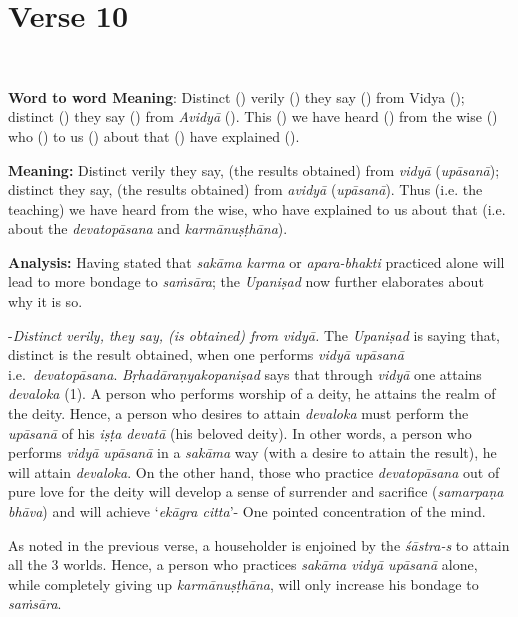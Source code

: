 \chapter{Verse 10}

\begin{moolashloka}
\\
\end{moolashloka}

\textbf{Word to word Meaning}: Distinct () verily () they say () from Vidya (); distinct () they say () from \emph{Avidyā} (). This () we have heard () from the wise () who () to us () about that () have explained ().

\textbf{Meaning:} Distinct verily they say, (the results obtained) from \emph{vidyā} (\emph{upāsanā}); distinct they say, (the results obtained) from \emph{avidyā} (\emph{upāsanā}). Thus (i.e. the teaching) we have heard from the wise, who have explained to us about that (i.e. about the \emph{devatopāsana} and \emph{karmānuṣṭhāna}).

\textbf{Analysis:} Having stated that \emph{sakāma karma} or \emph{apara-bhakti} practiced alone will lead to more bondage to \emph{saṁsāra}; the \emph{Upaniṣad} now further elaborates about why it is so.

-\emph{Distinct verily, they say, (is obtained) from vidyā.} The \emph{Upaniṣad} is saying that, distinct is the result obtained, when one performs \emph{vidyā upāsanā} i.e.\ \emph{devatopāsana}. \emph{Bṛhadāraṇyakopaniṣad} says that through \emph{vidyā} one attains \emph{devaloka} (1). A person who performs worship of a deity, he attains the realm of the deity. Hence, a person who desires to attain \emph{devaloka} must perform the \emph{upāsanā} of his \emph{iṣṭa devatā} (his beloved deity). In other words, a person who performs \emph{vidyā upāsanā} in a \emph{sakāma} way (with a desire to attain the result), he will attain \emph{devaloka}. On the other hand, those who practice \emph{devatopāsana} out of pure love for the deity will develop a sense of surrender and sacrifice (\emph{samarpaṇa bhāva}) and will achieve `\emph{ekāgra citta}'- One pointed concentration of the mind.

As noted in the previous verse, a householder is enjoined by the \emph{śāstra-s} to attain all the 3 worlds. Hence, a person who practices \emph{sakāma vidyā upāsanā} alone, while completely giving up \emph{karmānuṣṭhāna}, will only increase his bondage to \emph{saṁsāra}.

